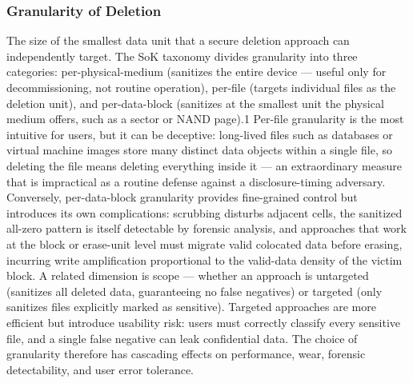 \subsubsection{Granularity of Deletion}
The size of the smallest data unit that a secure deletion approach can independently target. The SoK 
taxonomy divides granularity into three categories: per-physical-medium (sanitizes the entire device — 
useful only for decommissioning, not routine operation), per-file (targets individual files as the 
deletion unit), and per-data-block (sanitizes at the smallest unit the physical medium offers, such as a 
sector or NAND page).1 Per-file granularity is the most intuitive for users, but it can be deceptive: 
long-lived files such as databases or virtual machine images store many distinct data objects within a 
single file, so deleting the file means deleting everything inside it — an extraordinary measure that is 
impractical as a routine defense against a disclosure-timing adversary. Conversely, per-data-block 
granularity provides fine-grained control but introduces its own complications: scrubbing disturbs 
adjacent cells, the sanitized all-zero pattern is itself detectable by forensic analysis, and approaches 
that work at the block or erase-unit level must migrate valid colocated data before erasing, incurring 
write amplification proportional to the valid-data density of the victim block. A related dimension is 
scope — whether an approach is untargeted (sanitizes all deleted data, guaranteeing no false negatives) 
or targeted (only sanitizes files explicitly marked as sensitive). Targeted approaches are more 
efficient but introduce usability risk: users must correctly classify every sensitive file, and a single 
false negative can leak confidential data. The choice of granularity therefore has cascading effects on 
performance, wear, forensic detectability, and user error tolerance.

